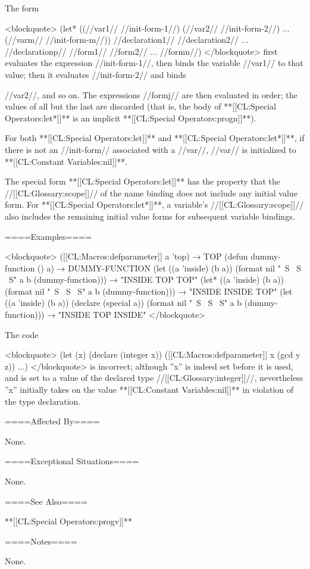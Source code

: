 The form

<blockquote> (let* ((//var1// //init-form-1//) (//var2// //init-form-2//) ... (//varm// //init-form-m//)) //declaration1// //declaration2// ... //declarationp// //form1// //form2// ... //formn//) </blockquote> first evaluates the expression //init-form-1//, then binds the variable //var1// to that value; then it evaluates //init-form-2// and binds

//var2//, and so on. The expressions //formj// are then evaluated in order; the values of all but the last are discarded (that is, the body of **[[CL:Special Operators:let*]]** is an implicit **[[CL:Special Operators:progn]]**).

For both **[[CL:Special Operators:let]]** and **[[CL:Special Operators:let*]]**, if there is not an //init-form// associated with a //var//, //var// is initialized to **[[CL:Constant Variables:nil]]**.

The special form **[[CL:Special Operators:let]]** has the property that the //[[CL:Glossary:scope]]// of the name binding does not include any initial value form. For **[[CL:Special Operators:let*]]**, a variable's //[[CL:Glossary:scope]]// also includes the remaining initial value forms for subsequent variable bindings.

====Examples====

<blockquote> ([[CL:Macros:defparameter]] a 'top) → TOP (defun dummy-function () a) → DUMMY-FUNCTION (let ((a 'inside) (b a)) (format nil "~S ~S ~S" a b (dummy-function))) → "INSIDE TOP TOP" (let* ((a 'inside) (b a)) (format nil "~S ~S ~S" a b (dummy-function))) → "INSIDE INSIDE TOP" (let ((a 'inside) (b a)) (declare (special a)) (format nil "~S ~S ~S" a b (dummy-function))) → "INSIDE TOP INSIDE" </blockquote>

\medbreak The code

<blockquote> (let (x) (declare (integer x)) ([[CL:Macros:defparameter]] x (gcd y z)) ...) </blockquote> is incorrect; although ''x'' is indeed set before it is used, and is set to a value of the declared type //[[CL:Glossary:integer]]//, nevertheless ''x'' initially takes on the value **[[CL:Constant Variables:nil]]** in violation of the type declaration.

====Affected By====

None.

====Exceptional Situations====

None.

====See Also====

**[[CL:Special Operators:progv]]**

====Notes====

None.

   
